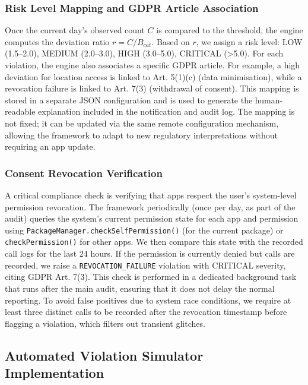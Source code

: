 \subsubsection{Risk Level Mapping and GDPR Article Association}

Once the current day's observed count \(C\) is compared to the threshold, the engine computes the deviation ratio \(r = C / B_{cat}\). Based on \(r\), we assign a risk level: LOW (1.5–2.0), MEDIUM (2.0–3.0), HIGH (3.0–5.0), CRITICAL (>5.0). For each violation, the engine also associates a specific GDPR article. For example, a high deviation for location access is linked to Art. 5(1)(c) (data minimisation), while a revocation failure is linked to Art. 7(3) (withdrawal of consent). This mapping is stored in a separate JSON configuration and is used to generate the human-readable explanation included in the notification and audit log. The mapping is not fixed; it can be updated via the same remote configuration mechanism, allowing the framework to adapt to new regulatory interpretations without requiring an app update.

\subsubsection{Consent Revocation Verification}

A critical compliance check is verifying that apps respect the user's system-level permission revocation. The framework periodically (once per day, as part of the audit) queries the system's current permission state for each app and permission using \texttt{PackageManager.checkSelfPermission()} (for the current package) or \texttt{checkPermission()} for other apps. We then compare this state with the recorded call logs for the last 24 hours. If the permission is currently denied but calls are recorded, we raise a \texttt{REVOCATION\_FAILURE} violation with CRITICAL severity, citing GDPR Art. 7(3). This check is performed in a dedicated background task that runs after the main audit, ensuring that it does not delay the normal reporting. To avoid false positives due to system race conditions, we require at least three distinct calls to be recorded after the revocation timestamp before flagging a violation, which filters out transient glitches.

\subsection{Automated Violation Simulator Implementation}

